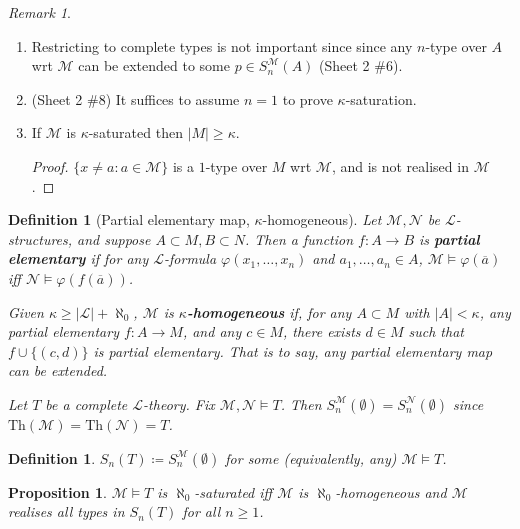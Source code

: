 \documentclass[]{article}
\theoremstyle{custhm}
\theoremstyle{cusdef}
\newtheorem{defin}[theorem]{Definition}
\theoremstyle{custhm}
\theoremstyle{custhm}
\theoremstyle{custhm}
\newtheorem{prop}[theorem]{Proposition}
\theoremstyle{ex}
\theoremstyle{custhm}
\theoremstyle{cusdef}
\theoremstyle{remark}
\theoremstyle{remark}
\newtheorem{remark}[theorem]{Remark}
\newcommand{\ra}{\rightarrow}
\newcommand{\undf}[1]{\textit{\textbf{#1}}}
\renewcommand{\L}{\mathcal{L}}
\newcommand{\M}{\mathcal{M}}
\renewcommand{\phi}{\varphi}
\renewcommand{\bar}{\overline}
\newcommand{\Th}{\textrm{Th}}
\newcommand{\N}{\mathcal{N}}
\begin{document}
\begin{remark}\ 
\begin{enumerate}[label = \alph*)]
	\item Restricting to complete types is not important since since any $n$-type over $A$ wrt $\M$ can be extended to some $p \in S_n^\M(A)$ (Sheet 2 \#6).
	\item (Sheet 2 \#8) It suffices to assume $n = 1$ to prove $\kappa$-saturation.
	\item If $\M$ is $\kappa$-saturated then $|M| \ge \kappa$.
	\begin{proof}
		$\{x \ne a:a\in \M\}$ is a $1$-type over $M$ wrt $\M$, and is not realised in $\M$.
	\end{proof}
\end{enumerate}
\end{remark}
\begin{defin}[Partial elementary map, $\kappa$-homogeneous]
Let $\M,\N$ be $\L$-structures, and suppose $A\subset M,B\subset N$. Then a function $f:A\ra B$ is \undf{partial elementary} if for any $\L$-formula $\phi(x_1,\dots,x_n)$ and $a_1,\dots,a_n\in A$, $\M\models \phi(\bar{a})$ iff $\N\models \phi(f(\bar{a}))$.

Given $\kappa\ge |\L| + \aleph_0$, $\M$ is \undf{$\kappa$-homogeneous} if, for any $A\subset M$ with $|A| < \kappa$, any partial elementary $f:A\ra M$, and any $c\in M$, there exists $d \in M$ such that $f\cup \{(c,d)\}$ is partial elementary. That is to say, any partial elementary map can be extended.

Let $T$ be a complete $\L$-theory. Fix $\M,\N\models T$. Then $S_n^\M(\emptyset) = S_n^\N(\emptyset)$ since $\Th(\M) = \Th(\N) = T$.
\end{defin}
\begin{defin}
$S_n(T) \coloneqq S_n^\M(\emptyset)$ for some (equivalently, any) $\M\models T$.
\end{defin}
\begin{prop}
$\M\models T$ is $\aleph_0$-saturated iff $\M$ is $\aleph_0$-homogeneous and $\M$ realises all types in $S_n(T)$ for all $n\ge 1$.
\end{prop}
\end{document}
